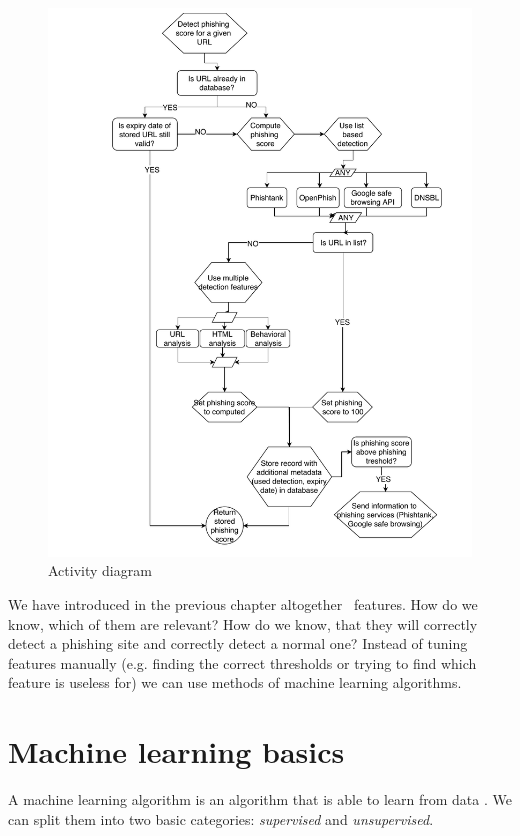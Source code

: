 \documentclass[
  digital, %
  oneside, %
  table,   %
  nolof,     %
  nolot,     %
]{fithesis3}
\newcounter{feature}
\begin{document}
\begin{figure}[]
  \begin{center}
    \includegraphics[width=12cm]{images/activity-diagram.pdf}
    \caption{Activity diagram}
    \label{fig:activity-diagram}
  \end{center}
\end{figure}

We have introduced in the previous chapter altogether \thefeature~features. How do we know, which of them are relevant? How do we know, that they will correctly detect a phishing site and correctly detect a normal one? Instead of tuning features manually (e.g. finding the correct thresholds or trying to find which feature is useless for) we can use methods of machine learning algorithms. %

\section{Machine learning basics}

A machine learning algorithm is an algorithm that is able to learn from data \cite{deep-learning}. We can split them into two basic categories: \textit{supervised} and \textit{unsupervised}.
\end{document}
